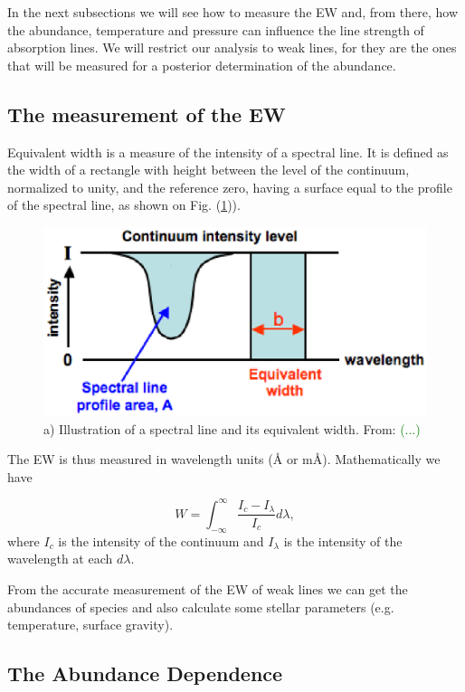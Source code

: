 \documentclass[dvips,12pt,a4paper]{report}
\begin{document}
{In the next subsections we will see how to measure the EW and, from there, how the abundance, temperature and pressure can influence the line strength of absorption lines. We will restrict our analysis to weak lines, for they are the ones that will be measured for a posterior determination of the abundance.

\subsection{The measurement of the EW}

Equivalent width is a measure of the intensity of a spectral line. It is defined as the width of a rectangle with height between the level of the continuum, normalized to unity, and the reference zero, having a surface equal to the profile of the spectral line, as shown on Fig. (\ref{ew})). 

\begin{figure}[h]
\centering
\includegraphics[height=5 cm]{pics/equivalent_width}
\caption{a) Illustration of a spectral line and its equivalent width. From: \textcolor{green}{(...)}}
\label{ew}
\end{figure}

The EW is thus measured in wavelength units (\AA{}  or m\AA). Mathematically we have

\begin{equation}
 W=\int_{-\infty}^{\infty} \frac{I_c-I_\lambda}{I_c}d\lambda,
\end{equation}
where $I_c$ is the intensity of the continuum and $I_\lambda$ is the intensity of the wavelength at each $d\lambda$.

From the accurate measurement of the EW of weak lines we can get the abundances of species and also calculate some stellar parameters (e.g. temperature, surface gravity).

\subsection{The Abundance Dependence}
\label{abdep}

}
\end{document}
